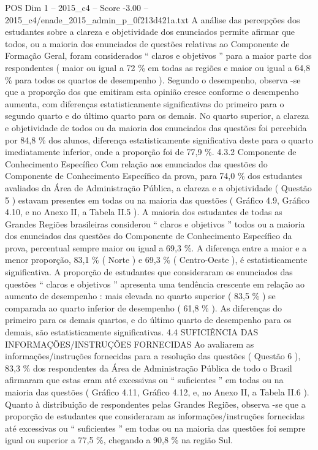 \begin{textsample}{POS Dim 1 – 2015\_c4 – Score -3.00 – 2015\_c4/enade\_2015\_admin\_p\_0f213d421a.txt}
A análise das percepções dos estudantes sobre a clareza e objetividade dos enunciados permite afirmar que todos, ou a maioria dos enunciados de questões relativas ao Componente de Formação Geral, foram considerados “ claros e objetivos ” para a maior parte dos respondentes ( maior ou igual a 72 \% em todas as regiões e maior ou igual a 64,8 \% para todos os quartos de desempenho ).
Segundo o desempenho, observa -se que a proporção dos que emitiram esta opinião cresce conforme o desempenho aumenta, com diferenças estatisticamente significativas do primeiro para o segundo quarto e do último quarto para os demais.
No quarto superior, a clareza e objetividade de todos ou da maioria dos enunciados das questões foi percebida por 84,8 \% dos alunos, diferença estatisticamente significativa deste para o quarto imediatamente inferior, onde a proporção foi de 77,9 \%. 4.3.2 Componente de Conhecimento Específico Com relação aos enunciados das questões do Componente de Conhecimento Específico da prova, para 74,0 \% dos estudantes avaliados da Área de Administração Pública, a clareza e a objetividade ( Questão 5 ) estavam presentes em todas ou na maioria das questões ( Gráfico 4.9, Gráfico 4.10, e no Anexo II, a Tabela II.5 ).
A maioria dos estudantes de todas as Grandes Regiões brasileiras considerou “ claros e objetivos ” todos ou a maioria dos enunciados das questões do Componente de Conhecimento Específico da prova, percentual sempre maior ou igual a 69,3 \%.
A diferença entre a maior e a menor proporção, 83,1 \% ( Norte ) e 69,3 \% ( Centro-Oeste ), é estatisticamente significativa.
A proporção de estudantes que consideraram os enunciados das questões “ claros e objetivos ” apresenta uma tendência crescente em relação ao aumento de desempenho : mais elevada no quarto superior ( 83,5 \% ) se comparada ao quarto inferior de desempenho ( 61,8 \% ).
As diferenças do primeiro para os demais quartos, e do último quarto de desempenho para os demais, são estatisticamente significativas. 4.4 SUFICIÊNCIA DAS INFORMAÇÕES/INSTRUÇÕES FORNECIDAS Ao avaliarem as informações/instruções fornecidas para a resolução das questões ( Questão 6 ), 83,3 \% dos respondentes da Área de Administração Pública de todo o Brasil afirmaram que estas eram até excessivas ou “ suficientes ” em todas ou na maioria das questões ( Gráfico 4.11, Gráfico 4.12, e, no Anexo II, a Tabela II.6 ).
Quanto à distribuição de respondentes pelas Grandes Regiões, observa -se que a proporção de estudantes que consideraram as informações/instruções fornecidas até excessivas ou “ suficientes ” em todas ou na maioria das questões foi sempre igual ou superior a 77,5 \%, chegando a 90,8 \% na região Sul.

\end{textsample}
